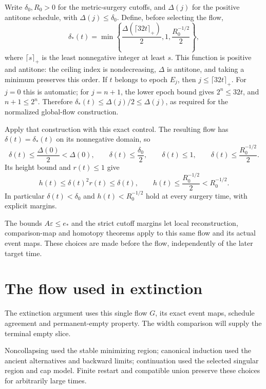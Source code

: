 Write $\delta_0,R_0>0$ for the metric-surgery cutoffs, and $\Delta(j)$
for the positive antitone schedule, with $\Delta(j)\leq\delta_0$.
Define, before selecting the flow,
\begin{equation}
 \delta_*(t)=\min\left\{
   \frac{\Delta(\lceil32t\rceil_+)}2,
   1,\frac{R_0^{-1/2}}2\right\},
 \label{eq:global-strict-control}
\end{equation}
where $\lceil s\rceil_+$ is the least nonnegative integer at least $s$.
This function is positive and antitone: the ceiling index is nondecreasing,
$\Delta$ is antitone, and taking a minimum preserves this order.
If $t$ belongs to epoch $E_j$, then $j\leq\lceil32t\rceil_+$.
For $j=0$ this is automatic; for $j=n+1$, the lower epoch bound gives
$2^n\leq32t$, and $n+1\leq2^n$.  Therefore
$\delta_*(t)\leq\Delta(j)/2\leq\Delta(j)$, as required for the
normalized global-flow construction.

Apply that construction with this exact control.  The resulting flow has
$\delta(t)=\delta_*(t)$ on its nonnegative domain, so
\[
 \delta(t)\leq\frac{\Delta(0)}2<\Delta(0),\qquad
 \delta(t)\leq\frac{\delta_0}2,\qquad
 \delta(t)\leq1,\qquad
 \delta(t)\leq\frac{R_0^{-1/2}}2.
\]
Its height bound and $r(t)\leq1$ give
\[
 h(t)\leq\delta(t)^2r(t)\leq\delta(t),
 \qquad h(t)\leq\frac{R_0^{-1/2}}2<R_0^{-1/2}.
\]
In particular $\delta(t)<\delta_0$ and $h(t)<R_0^{-1/2}$ hold at
every surgery time, with explicit margins.

The bounds $A\varepsilon\leq e_*$ and the strict cutoff margins let local
reconstruction, comparison-map and homotopy theorems apply to this same
flow and its actual event maps. These choices are made before the flow,
independently of the later target time.

\section{The flow used in extinction}
\label{sec:global-interfaces}

The extinction argument uses this single flow $G$, its exact event maps,
schedule agreement and permanent-empty property. The width comparison
will supply the terminal empty slice.

Noncollapsing used the stable minimizing region; canonical induction used
the ancient alternatives and backward limits; continuation used the
selected singular region and cap model. Finite restart and compatible
union preserve these choices for arbitrarily large times.
